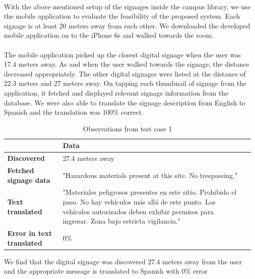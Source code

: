 \documentclass[12pt]{article}
\begin{document}
\paragraph{}With the above mentioned setup of the signages inside the campus library, we use the mobile application to evaluate the feasibility of the proposed system. Each signage is at least 20 meters away from each other. We downloaded the developed mobile application on to the iPhone 6s and walked towards the room.

\paragraph{}The mobile application picked up the closest digital signage when the user was 17.4 meters away. As and when the user walked towards the signage, the distance decreased appropriately. The other digital signages were listed at the distance of 22.3 meters and 27 meters away. On tapping each thumbnail of signage from the application, it fetched and displayed relevant signage information from the database. We were also able to translate the signage description from English to Spanish and the translation was 100\% correct.

\begin{table}%
    \centering
  
    \label{my-label}
       \begin{tabular}{|p{30mm}|p{55mm}|p{35mm}|}
 \hline
  & \textbf{Data}  \\ [0.5ex] 
 \hline\hline
 \textbf{Discovered} & 27.4 meters away  \\ 
 \hline
 \textbf{Fetched signage data} & "Hazardous materials present at this site. No trespassing."  \\
 \hline
 \textbf{Text translated} &  "Materiales peligrosos presentes en este sitio. Prohibido el paso. No hay vehículos más allá de este punto. Los vehículos autorizados deben exhibir permisos para ingresar. Zona bajo estricta vigilancia." \\
 \hline
 \textbf{Error in text translated} & 0\%   \\ [1ex] 
 \hline
    \end{tabular}
      \caption{Observations from test case 1}{We find that the digital signage was discovered 27.4 meters away from the user and the appropriate message is translated to Spanish with 0\% error} 
\end{table}
\end{document}
